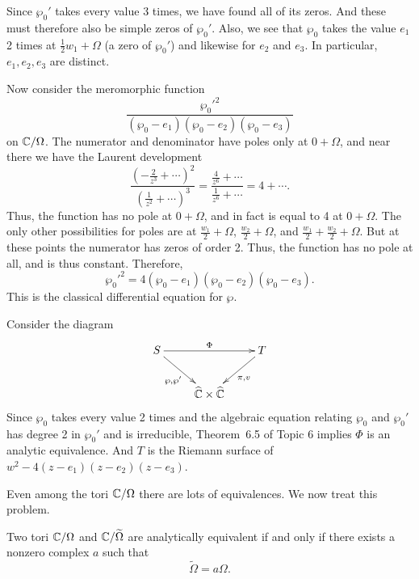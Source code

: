 \documentclass[a4paper,11pt]{article}
\begin{document}
\begin{mdframed}
  Since $\wp_0'$ takes every value 3 times, we have found all of its
  zeros.  And these must therefore also be simple zeros of $\wp_0'$.
  Also, we see that $\wp_0$ takes the value $e_1$ 2 times at
  $\frac{1}{2}w_1 + \Omega$ (a zero of $\wp_0'$) and likewise for
  $e_2$ and $e_3$.  In particular, $e_1, e_2, e_3$ are distinct.

  Now consider the meromorphic function
  $$
  \frac{\wp_0'^2}{(\wp_0-e_1)(\wp_0-e_2)(\wp_0-e_3)}
  $$
  on ${\mathbb C}/\Omega$.  The numerator and denominator have poles only at
  $0 + \Omega$, and near there we have the Laurent development
  $$
  \frac{(-\frac{2}{z^3} + \cdots)^2}{(\frac{1}{z^2} + \cdots)^3}
  = \frac{\frac{4}{z^6} + \cdots}{\frac{1}{z^6} + \cdots}
  = 4 + \cdots.
  $$
  Thus, the function has no pole at $0 + \Omega$, and in fact is equal
  to 4 at $0 + \Omega$.  The only other possibilities for poles are at
  $\frac{w_1}{2} + \Omega$, $\frac{w_2}{2} + \Omega$, and
  $\frac{w_1}{2} + \frac{w_2}{2} + \Omega$.  But at these points the
  numerator has zeros of order 2.  Thus, the function has no pole at
  all, and is thus constant.  Therefore,
  $$
  \wp_0'^2 = 4(\wp_0 - e_1)(\wp_0 - e_2)(\wp_0 - e_3).
  $$
  This is the classical differential equation for $\wp$.

  Consider the diagram
  $$
  \xymatrix {
    S \ar[rr]^{\Phi} \ar[dr]_{\wp,\wp'} && T \ar[dl]^{\pi, v}\\
    & \widehat{\CCC} \times \widehat{\CCC}
  }
  $$
  Since $\wp_0$ takes every value 2 times and the algebraic equation
  relating $\wp_0$ and $\wp_0'$ has degree 2 in $\wp_0'$ and is
  irreducible, Theorem~6.5 of Topic 6 implies $\Phi$ is an
  analytic equivalence.  And $T$ is the Riemann surface of $w^2 -
  4(z-e_1)(z-e_2)(z-e_3)$.
\end{mdframed}

Even among the tori ${\mathbb C}/\Omega$ there are lots of equivalences.  We
now treat this problem.

\begin{thm}
  \label{thm:2}
  Two tori ${\mathbb C} / \Omega$ and ${\mathbb C} / \widetilde{\Omega}$ are
  analytically equivalent if and only if there exists a nonzero
  complex $a$ such that
  $$
  \widetilde{\Omega} = a \Omega.
  $$
\end{thm}
\end{document}
